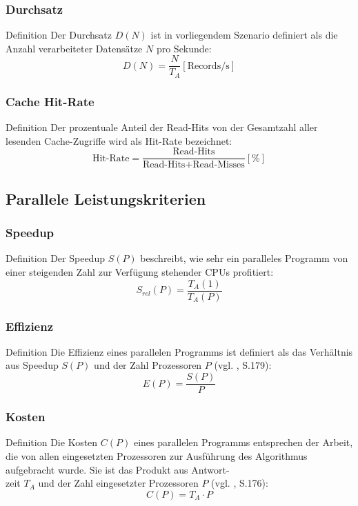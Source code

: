 \documentclass[presentation, shownotes]{beamer}
\begin{document}
\begin{frame}
\frametitle{Durchsatz}
    \begin{block}{Definition}
    Der Durchsatz $D(N)$ ist in vorliegendem Szenario definiert als die Anzahl verarbeiteter Datensätze $N$ pro Sekunde:
    $$D(N) = \frac{N}{T_A} [\text{Records/s}]$$
    \end{block}
\end{frame}

\begin{frame}
\frametitle{Cache Hit-Rate}
    \begin{block}{Definition}
    Der prozentuale Anteil der Read-Hits von der Gesamtzahl aller lesenden Cache-Zugriffe wird als Hit-Rate bezeichnet:
    $$\text{Hit-Rate} = \frac{\text{Read-Hits}}{\text{Read-Hits} + \text{Read-Misses}} [\%]$$
    \end{block}
\end{frame}


\subsection{Parallele Leistungskriterien}

\begin{frame}
\frametitle{Speedup}
    \begin{block}{Definition}
        Der Speedup $S(P)$ beschreibt, wie sehr ein paralleles Programm von einer steigenden Zahl zur Verfügung stehender CPUs profitiert:
        $$S_{rel}(P) = \frac{T_A(1)}{T_A(P)}$$
    \end{block}
\end{frame}

\begin{frame}
\frametitle{Effizienz}
    \begin{block}{Definition}
        Die Effizienz eines parallelen Programms ist definiert als das Verhältnis aus Speedup $S(P)$ und der Zahl Prozessoren $P$ (vgl. \cite{rauber2012parallele}, S.179):
    $$E(P) = \frac{S(P)}{P}$$
    \end{block}
\end{frame}

\begin{frame}
\frametitle{Kosten}
    \begin{block}{Definition}
    Die Kosten $C(P)$ eines parallelen Programms entsprechen der Arbeit, die von allen eingesetzten Prozessoren zur Ausführung des Algorithmus aufgebracht wurde. Sie ist das Produkt aus Antwort-\\
    zeit $T_A$ und der Zahl eingesetzter Prozessoren $P$ (vgl. \cite{rauber2012parallele}, S.176):
    $$C(P) = T_A \cdot P$$
    \end{block}
\end{frame}
\end{document}
